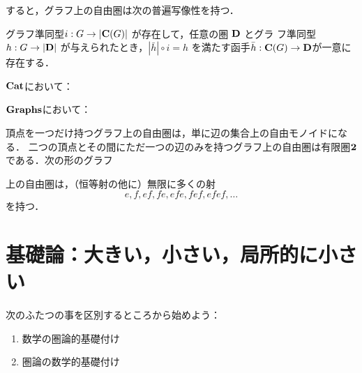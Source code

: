 すると，グラフ上の自由圏は次の普遍写像性を持つ．
\begin{UMPofFreeCat}
 グラフ準同型$i: G \to |{\bf C}(G)|$ が存在して，任意の圏 ${\bf D}$ とグラ
 フ準同型$h: G \to |{\bf D}|$ が与えられたとき，$|\bar h| \circ i = h$
 を満たす函手$\bar h : {\bf C}(G) \to {\bf D}$が一意に存在する．

 $\mathbf{Cat}$において：
 \begin{center}
 \end{center}

 ${\bf Graphs}$において：
 \begin{center}
 \end{center}
\end{UMPofFreeCat}

頂点を一つだけ持つグラフ上の自由圏は，単に辺の集合上の自由モノイドになる．
二つの頂点とその間にただ一つの辺のみを持つグラフ上の自由圏は有限圏${\bf
2}$ である．次の形のグラフ
\begin{center}
\end{center}
上の自由圏は，（恒等射の他に）無限に多くの射
\[
 e, f, ef, fe, efe, fef, efef, \ldots
\]
を持つ．

\section{基礎論：大きい，小さい，局所的に小さい}
\label{sec:foundations}
次のふたつの事を区別するところから始めよう：

\begin{enumerate}
 \renewcommand{\labelenumi}{(\roman{enumi})}
 \item 数学の圏論的基礎付け
 \item 圏論の数学的基礎付け
\end{enumerate}

